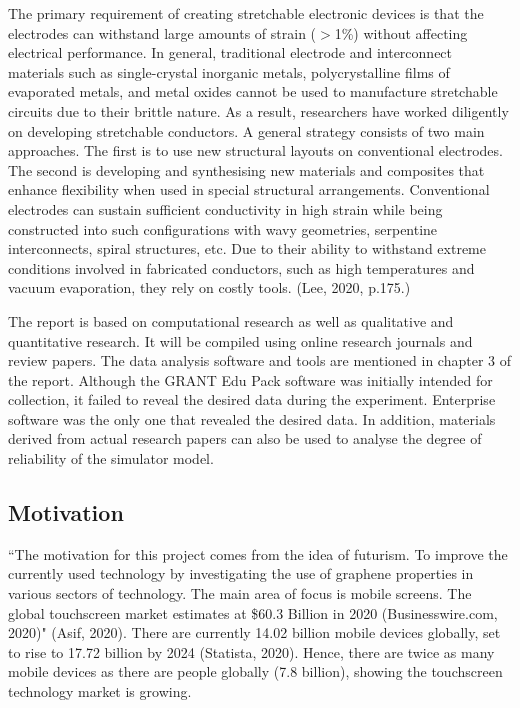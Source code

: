 \documentclass[a4paper,12pt]{article}
\numberwithin{equation}{section}
\numberwithin{figure}{section}
\begin{document}
\noindent The primary requirement of creating stretchable electronic devices is that the electrodes can withstand large amounts of strain ($>$1\%) without affecting electrical performance. In general, traditional electrode and interconnect materials such as single-crystal inorganic metals, polycrystalline films of evaporated metals, and metal oxides cannot be used to manufacture stretchable circuits due to their brittle nature. As a result, researchers have worked diligently on developing stretchable conductors. A general strategy consists of two main approaches. The first is to use new structural layouts on conventional electrodes. The second is developing and synthesising new materials and composites that enhance flexibility when used in special structural arrangements. Conventional electrodes can sustain sufficient conductivity in high strain while being constructed into such configurations with wavy geometries, serpentine interconnects, spiral structures, etc. Due to their ability to withstand extreme conditions involved in fabricated conductors, such as high temperatures and vacuum evaporation, they rely on costly tools. (Lee, 2020, p.175.)\vspace{\baselineskip}

\noindent The report is based on computational research as well as qualitative and quantitative research. It will be compiled using online research journals and review papers. The data analysis software and tools are mentioned in chapter 3 of the report. Although the GRANT Edu Pack software was initially intended for collection, it failed to reveal the desired data during the experiment. Enterprise software was the only one that revealed the desired data. In addition, materials derived from actual research papers can also be used to analyse the degree of reliability of the simulator model.

\subsection{Motivation}

\noindent ``The motivation for this project comes from the idea of futurism. To improve the currently used technology by investigating the use of graphene properties in various sectors of technology. The main area of focus is mobile screens. The global touchscreen market estimates at \$60.3 Billion in 2020 (Businesswire.com, 2020)" (Asif, 2020). There are currently 14.02 billion mobile devices globally, set to rise to 17.72 billion by 2024 (Statista, 2020).  Hence, there are twice as many mobile devices as there are people globally (7.8 billion), showing the touchscreen technology market is growing.\vspace{\baselineskip}
\end{document}
